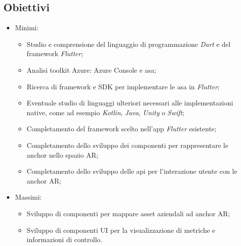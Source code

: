 \subsection{Obiettivi}
\begin{itemize}
    \item Minimi:
        \begin{itemize}
            \item Studio e comprensione del linguaggio di programmazione \textit    {Dart} e del \gls{framework} \textit{Flutter};
            \item Analisi toolkit Azure: Azure Console e \gls{asa};
            \item Ricerca di \gls{framework} e \gls{SDK} per implementare le \gls   {asa} in \textit{Flutter};
            \item Eventuale studio di linguaggi ulteriori necessari alle    implementazioni native, come ad esempio \textit{Kotlin}, \textit{Java},    \textit{Unity} o \textit{Swift};
            \item Completamento del \gls{framework} scelto nell'app \textit{Flutter}    esistente;
            \item Completamento dello sviluppo dei componenti per rappresentare le \Gls{anchor} nello spazio AR;
            \item Completamento dello sviluppo delle \acrshort{api} per l'interazione utente con le \Gls{anchor} AR;
        \end{itemize}
    \item Massimi: 
        \begin{itemize}
            \item Sviluppo di componenti per mappare \gls{asset} aziendali ad \Gls{anchor} AR;
            \item Sviluppo di componenti UI per la visualizzazione di metriche e informazioni di controllo.
        \end{itemize}
\end{itemize}


